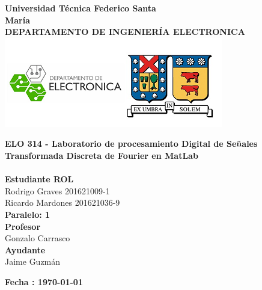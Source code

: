 \documentclass[12pt,a4paper]{article} %
\begin{document}
\begin{titlepage}
\begin{center}
\textbf{\LARGE Universidad Técnica Federico Santa}\\[0.25cm]
\textbf{\LARGE María}\\[0.5cm]
\textbf{\large DEPARTAMENTO DE INGENIERÍA ELECTRONICA}\\[0.2cm]
\vspace{20pt}
\includegraphics{logousm.png}\\[1cm]

\par
\vspace{15pt}
\textbf{\Large ELO 314 - Laboratorio de procesamiento Digital de Señales}\\
\vspace{15pt}
\myrule[1pt][7pt]
\textbf{\LARGE Transformada Discreta de Fourier en MatLab}\\[0.25cm]
\vspace{15pt}
\textbf{\large  }\\
\myrule[1pt][7pt]
\vspace{55pt}
\textbf{\large Estudiante \hspace{75pt} ROL}\\
    \hspace{0pt}Rodrigo Graves\hspace{80pt} 201621009-1 \\
     Ricardo Mardones      \hspace{60pt} 201621036-9 \\
   


\vspace{30pt}
\textbf{\large Paralelo: \hspace{30pt} 1}\\

\vspace{35pt}
\textbf {\large Profesor}\\[0.2cm]
\Large { Gonzalo Carrasco}\\[0.1cm]
\textbf {\large Ayudante}\\[0.2cm]
\Large {Jaime Guzmán}\\[0.1cm]
\end{center}

\par
\vfill
\begin{center}
\textbf{Fecha : \today}\\
\end{center}

\end{titlepage}
\end{document}
